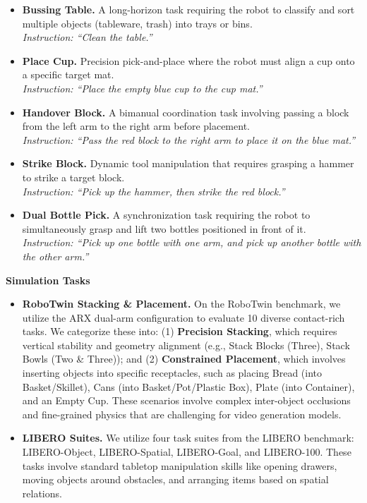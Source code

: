 \begin{itemize}
    \item \textbf{Bussing Table.} A long-horizon task requiring the robot to classify and sort multiple objects (tableware, trash) into trays or bins. \\
    \textit{Instruction: ``Clean the table.''}
    
    \item \textbf{Place Cup.} Precision pick-and-place where the robot must align a cup onto a specific target mat. \\
    \textit{Instruction: ``Place the empty blue cup to the cup mat.''}
    
    \item \textbf{Handover Block.} A bimanual coordination task involving passing a block from the left arm to the right arm before placement. \\
    \textit{Instruction: ``Pass the red block to the right arm to place it on the blue mat.''}
    
    \item \textbf{Strike Block.} Dynamic tool manipulation that requires grasping a hammer to strike a target block. \\
    \textit{Instruction: ``Pick up the hammer, then strike the red block.''}

    \item \textbf{Dual Bottle Pick.} A synchronization task requiring the robot to simultaneously grasp and lift two bottles positioned in front of it. \\
    \textit{Instruction: ``Pick up one bottle with one arm, and pick up another bottle with the other arm.''}
\end{itemize}

\textbf{Simulation Tasks}
\begin{itemize}
    \item \textbf{RoboTwin Stacking \& Placement.} On the RoboTwin benchmark, we utilize the ARX dual-arm configuration to evaluate 10 diverse contact-rich tasks. 
    We categorize these into: 
    (1) \textbf{Precision Stacking}, which requires vertical stability and geometry alignment (e.g., Stack Blocks (Three), Stack Bowls (Two \& Three)); and 
    (2) \textbf{Constrained Placement}, which involves inserting objects into specific receptacles, such as placing Bread (into Basket/Skillet), Cans (into Basket/Pot/Plastic Box), Plate (into Container), and an Empty Cup. 
    These scenarios involve complex inter-object occlusions and fine-grained physics that are challenging for video generation models.
    
    \item \textbf{LIBERO Suites.} We utilize four task suites from the LIBERO benchmark: LIBERO-Object, LIBERO-Spatial, LIBERO-Goal, and LIBERO-100. These tasks involve standard tabletop manipulation skills like opening drawers, moving objects around obstacles, and arranging items based on spatial relations.
\end{itemize}

